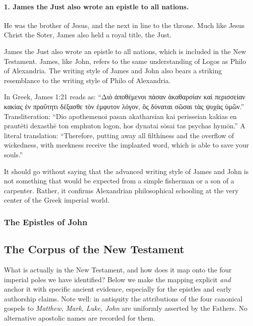 \paragraph{1.
James the Just also wrote an epistle to all nations.}\label{par:james-the-just-also-wrote-an-epistle-to-all-nations.}

He was the brother of Jesus, and the next in line to the throne.
Much like Jesus Christ the Soter, James also held a royal title, the Just.

James the Just also wrote an epistle to all nations, which is included in the New Testament.
James, like John, refers to the same understanding of Logos as Philo of Alexandria.
The writing style of James and John also bears a striking resemblance to the writing style of Philo of Alexandria.

In Greek, James 1:21 reads as:
``Διὸ ἀποθέμενοι πάσαν ἀκαθαρσίαν καὶ περισσείαν κακίας ἐν πραΰτητι δέξασθε τὸν ἐμφυτον λόγον, ὃς δύναται σῶσαι τὰς ψυχὰς ὑμῶν.''
Transliteration: ``Dio apothemenoi pasan akatharsian kai perisseian kakias en prautēti dexasthē ton emphuton logon, hos dynatai sōsai tas psychas hymōn.''
A literal translation: ``Therefore, putting away all filthiness and the overflow of wickedness, with meekness receive the implanted word, which is able to save your souls.''

It should go without saying that the advanced writing style of James and John is not something that would be expected from a simple fisherman or a son of a carpenter.
Rather, it confirms Alexandrian philosophical schooling at the very center of the Greek imperial world.

\subsubsection{The Epistles of John}\label{par:the-epistles-of-john}


\subsection{The Corpus of the New Testament}\label{subsec:the-corpus-of-the-new-testament}

What is actually in the New Testament, and how does it map onto the four imperial poles we have identified?
Below we make the mapping explicit \emph{and} anchor it with specific ancient evidence, especially for the epistles and early authorship claims.
Note well: in antiquity the attributions of the four canonical gospels to \textit{Matthew, Mark, Luke, John} are uniformly asserted by the Fathers.
No alternative apostolic names are recorded for them.

